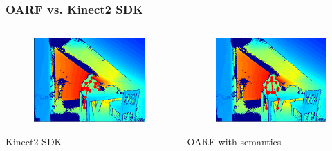 \documentclass[xcolor=dvipsnames]{beamer}
\begin{document}
\begin{frame}
\frametitle{OARF vs. Kinect2 SDK}
	\begin{columns}
		\begin{column}{.5\textwidth}
			\begin{figure}
				\includegraphics[width=\textwidth]{img/res3.png}
			\end{figure}
			\begin{center}
				Kinect2 SDK
			\end{center}
		\end{column}
		\begin{column}{.5\textwidth}
			\begin{figure}
				\includegraphics[width=\textwidth]{img/res1.png}
			\end{figure}
			\begin{center}
				OARF with semantics
			\end{center}
		\end{column}
	\end{columns}
\end{frame}
\end{document}
